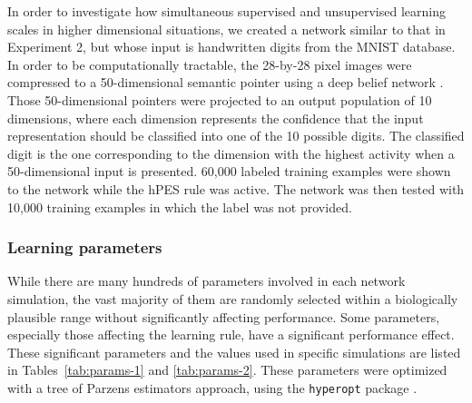 \documentclass[10pt,letterpaper]{article}
\begin{document}
In order to investigate how
simultaneous supervised and unsupervised learning
scales in higher dimensional situations,
we created a network similar to that in Experiment 2,
but whose input is handwritten digits
from the MNIST database.
In order to be computationally tractable,
the 28-by-28 pixel images were compressed to a 50-dimensional
semantic pointer using a deep belief network \cite{Tang2010}.
Those 50-dimensional pointers were projected to
an output population of 10 dimensions,
where each dimension represents
the confidence that the input representation should
be classified into one of the 10 possible digits.
The classified digit is the one corresponding
to the dimension with the highest activity
when a 50-dimensional input is presented.
60,000 labeled training examples
were shown to the network while
the hPES rule was active.
The network was then tested with 10,000
training examples in which the label
was not provided.

\subsubsection{Learning parameters}

While there are many hundreds of parameters
involved in each network simulation,
the vast majority of them are randomly selected
within a biologically plausible range
without significantly affecting performance.
Some parameters, especially those affecting
the learning rule, have a significant performance effect.
These significant parameters and the values
used in specific simulations are listed
in Tables~\ref{tab:params-1} and \ref{tab:params-2}.
These parameters were optimized
with a tree of Parzens estimators approach,
using the \texttt{hyperopt} package \cite{Bergstra2013}.
\end{document}
